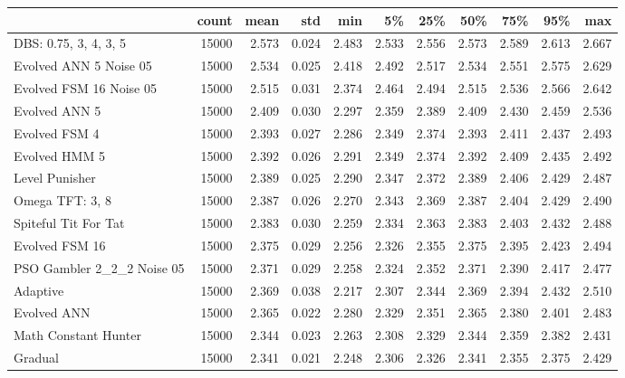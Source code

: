 \begin{tabular}{lrrrrrrrrrr}
\toprule
{} &  count &   mean &    std &    min &     5\% &    25\% &    50\% &    75\% &    95\% &    max \\
\midrule
DBS: 0.75, 3, 4, 3, 5      &  15000 &  2.573 &  0.024 &  2.483 &  2.533 &  2.556 &  2.573 &  2.589 &  2.613 &  2.667 \\
Evolved ANN 5 Noise 05     &  15000 &  2.534 &  0.025 &  2.418 &  2.492 &  2.517 &  2.534 &  2.551 &  2.575 &  2.629 \\
Evolved FSM 16 Noise 05    &  15000 &  2.515 &  0.031 &  2.374 &  2.464 &  2.494 &  2.515 &  2.536 &  2.566 &  2.642 \\
Evolved ANN 5              &  15000 &  2.409 &  0.030 &  2.297 &  2.359 &  2.389 &  2.409 &  2.430 &  2.459 &  2.536 \\
Evolved FSM 4              &  15000 &  2.393 &  0.027 &  2.286 &  2.349 &  2.374 &  2.393 &  2.411 &  2.437 &  2.493 \\
Evolved HMM 5              &  15000 &  2.392 &  0.026 &  2.291 &  2.349 &  2.374 &  2.392 &  2.409 &  2.435 &  2.492 \\
Level Punisher             &  15000 &  2.389 &  0.025 &  2.290 &  2.347 &  2.372 &  2.389 &  2.406 &  2.429 &  2.487 \\
Omega TFT: 3, 8            &  15000 &  2.387 &  0.026 &  2.270 &  2.343 &  2.369 &  2.387 &  2.404 &  2.429 &  2.490 \\
Spiteful Tit For Tat       &  15000 &  2.383 &  0.030 &  2.259 &  2.334 &  2.363 &  2.383 &  2.403 &  2.432 &  2.488 \\
Evolved FSM 16             &  15000 &  2.375 &  0.029 &  2.256 &  2.326 &  2.355 &  2.375 &  2.395 &  2.423 &  2.494 \\
PSO Gambler 2\_2\_2 Noise 05 &  15000 &  2.371 &  0.029 &  2.258 &  2.324 &  2.352 &  2.371 &  2.390 &  2.417 &  2.477 \\
Adaptive                   &  15000 &  2.369 &  0.038 &  2.217 &  2.307 &  2.344 &  2.369 &  2.394 &  2.432 &  2.510 \\
Evolved ANN                &  15000 &  2.365 &  0.022 &  2.280 &  2.329 &  2.351 &  2.365 &  2.380 &  2.401 &  2.483 \\
Math Constant Hunter       &  15000 &  2.344 &  0.023 &  2.263 &  2.308 &  2.329 &  2.344 &  2.359 &  2.382 &  2.431 \\
Gradual                    &  15000 &  2.341 &  0.021 &  2.248 &  2.306 &  2.326 &  2.341 &  2.355 &  2.375 &  2.429 \\
\bottomrule
\end{tabular}
